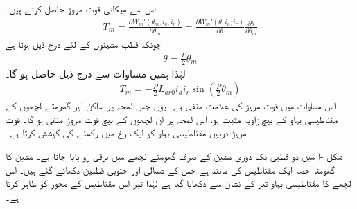 اس سے میکانی قوت مروڑ  حاصل کرتے ہیں۔
\begin{align}\label{مساوات_گھومتے_مشین_مروڑ_بذریعہ_توانائی}
T_m=\frac{\partial W_m'(\theta_m,i_a,i_r)}{\partial \theta_m}=\frac{\partial W_m'(\theta,i_a,i_r)}{\partial \theta} \frac{\partial \theta}{\partial \theta_m}
\end{align}
چونکہ  قطب مشینوں کے لئے درج ذیل ہوتا ہے
\begin{align}
\theta=\frac{P}{2} \theta_m
\end{align}
لہٰذا ہمیں مساوات   سے درج ذیل حاصل ہو گا۔
\begin{align}\label{مساوات_گھومتے_مشین_مروڑ_بذریعہ_کوتوانائی}
T_m=-\frac{P}{2} L_{ar0} i_a i_r \sin \left(\frac{P}{2} \theta_m\right)
\end{align}
اس مساوات میں قوت مروڑ  کی علامت منفی ہے۔ یوں جس لمحہ پر ساکن اور گھومتے لچھوں کے مقناطیسی بہاو کے بیچ  زاویہ مثبت ہو، اس لمحہ پر ان لچھوں کے بیچ قوت مروڑ منفی ہو گا۔  قوت مروڑ  دونوں مقناطیسی بہاو کو ایک رخ میں رکھنے کی کوشش کرتا ہے۔

شکل -ا  میں دو قطبی یک دوری مشین کے صرف گھومتے لچھے میں برقی رو پایا جاتا ہے۔   مشین کا  گھومتا حصہ  ایک مقناطیس کی مانند ہے جس کے شمالی اور جنوبی قطبین دکھائے گئے ہیں۔ اس لچھے کا مقناطیسی بہاو تیر کے نشان سے دکھایا گیا ہے لہٰذا  تیر اس مقناطیس کے محور کو ظاہر کرتا ہے۔

